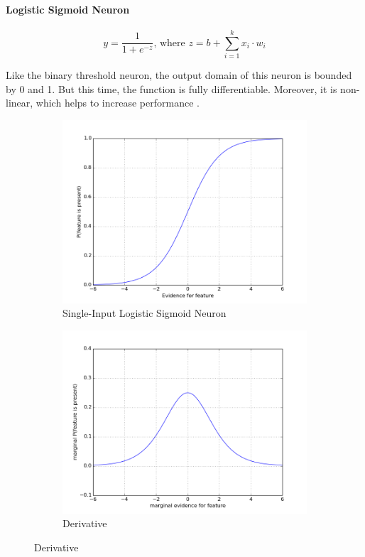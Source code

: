 \documentclass[a4paper,11pt]{article}
\begin{document}
\paragraph{Logistic Sigmoid Neuron} 
\begin{equation}
\label{sigmoid neuron}
y = \frac{1}{1 + e^{-z}} \text{, where } z = b + \sum\limits_{i=1}^k x_{i}\cdot w_{i}
\end{equation}

Like the binary threshold neuron, the output domain of this neuron is bounded by 0 and 1. But this time, the function is fully differentiable. Moreover, it is non-linear, which helps to increase performance \cite{DL-book}.

\begin{figure}[h!]
	\centering
	\begin{subfigure}{.5\textwidth}
  		\centering
		\includegraphics[scale=0.4]{images/logistic.png}
		\caption{Single-Input Logistic Sigmoid Neuron}
	\end{subfigure}%
	\begin{subfigure}{.5\textwidth}
  		\centering
		\includegraphics[scale=0.4]{images/logistic-derivative.png}
		\caption{Derivative}
	\end{subfigure}
\end{figure}
\end{document}
